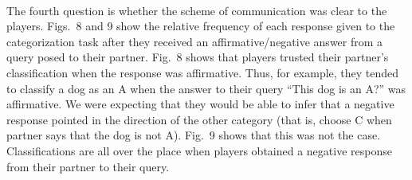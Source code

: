 \documentclass{article}
\begin{document}
\

The fourth question is whether the scheme of communication was clear to the players. Figs.~8 and 9 show the relative frequency of each response given to the categorization task after they received an affirmative/negative answer from a query posed to their partner. Fig.~8 shows that players trusted their partner's classification when the response was affirmative. Thus, for example, they tended to classify a dog as an A when the answer to their query ``This dog is an A?'' was affirmative. We were expecting that they would be able to infer that a negative response pointed in the direction of the other category (that is, choose C when partner says that the dog is not A). Fig.~9 shows that this was not the case. Classifications are all over the place when players obtained a negative response from their partner to their query.

\
\end{document}
